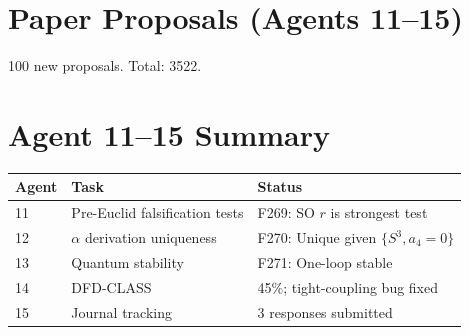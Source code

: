 \documentclass[11pt,a4paper]{article}
\begin{document}
\section{Paper Proposals (Agents 11--15)}

100 new proposals. Total: 3522.

\section{Agent 11--15 Summary}

\begin{tcolorbox}[colback=green!5!white, colframe=dfdgreen]
\begin{center}
\begin{tabular}{lll}
\toprule
\textbf{Agent} & \textbf{Task} & \textbf{Status} \\
\midrule
11 & Pre-Euclid falsification tests & F269: SO $r$ is strongest test \\
12 & $\alpha$ derivation uniqueness & F270: Unique given $\{S^3, a_4=0\}$ \\
13 & Quantum stability & F271: One-loop stable \\
14 & DFD-CLASS & 45\%; tight-coupling bug fixed \\
15 & Journal tracking & 3 responses submitted \\
\bottomrule
\end{tabular}
\end{center}
\end{tcolorbox}
\end{document}
